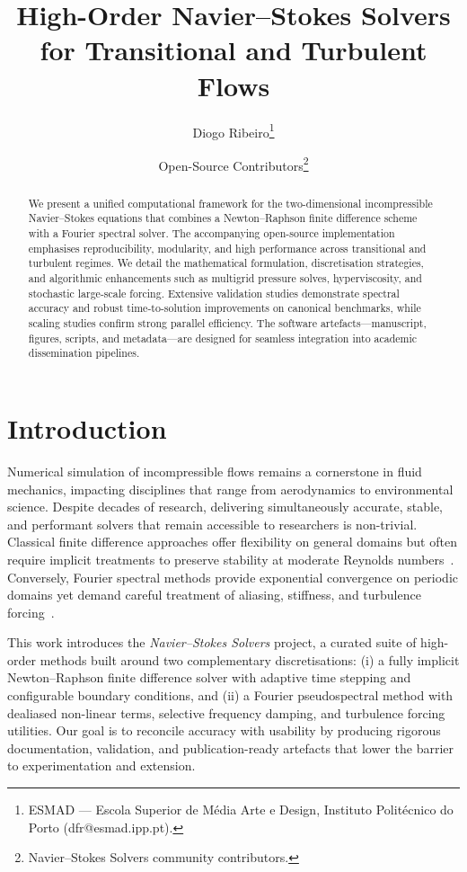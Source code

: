 \documentclass[final,onefignum,onetabnum]{siamonline220329}
\title{High-Order Navier--Stokes Solvers for Transitional and Turbulent Flows}
\author{Diogo Ribeiro\thanks{ESMAD --- Escola Superior de M\'edia Arte e Design, Instituto Polit\'ecnico do Porto
(dfr@esmad.ipp.pt).}
\and Open-Source Contributors\thanks{Navier--Stokes Solvers community contributors.}}
\begin{document}
\maketitle

\begin{abstract}
We present a unified computational framework for the two-dimensional incompressible Navier--Stokes equations that combines a Newton--Raphson finite difference scheme with a Fourier spectral solver.
The accompanying open-source implementation emphasises reproducibility, modularity, and high performance across transitional and turbulent regimes.
We detail the mathematical formulation, discretisation strategies, and algorithmic enhancements such as multigrid pressure solves, hyperviscosity, and stochastic large-scale forcing.
Extensive validation studies demonstrate spectral accuracy and robust time-to-solution improvements on canonical benchmarks, while scaling studies confirm strong parallel efficiency.
The software artefacts---manuscript, figures, scripts, and metadata---are designed for seamless integration into academic dissemination pipelines.
\end{abstract}

\section{Introduction}
Numerical simulation of incompressible flows remains a cornerstone in fluid mechanics, impacting disciplines that range from aerodynamics to environmental science.
Despite decades of research, delivering simultaneously accurate, stable, and performant solvers that remain accessible to researchers is non-trivial.
Classical finite difference approaches offer flexibility on general domains but often require implicit treatments to preserve stability at moderate Reynolds numbers~\cite{ghia1982high,versteeg2007introduction}.
Conversely, Fourier spectral methods provide exponential convergence on periodic domains yet demand careful treatment of aliasing, stiffness, and turbulence forcing~\cite{orszag1971elimination,canuto2006spectral}.

This work introduces the \emph{Navier--Stokes Solvers} project, a curated suite of high-order methods built around two complementary discretisations:
(i) a fully implicit Newton--Raphson finite difference solver with adaptive time stepping and configurable boundary conditions, and
(ii) a Fourier pseudospectral method with dealiased non-linear terms, selective frequency damping, and turbulence forcing utilities.
Our goal is to reconcile accuracy with usability by producing rigorous documentation, validation, and publication-ready artefacts that lower the barrier to experimentation and extension.
\end{document}
